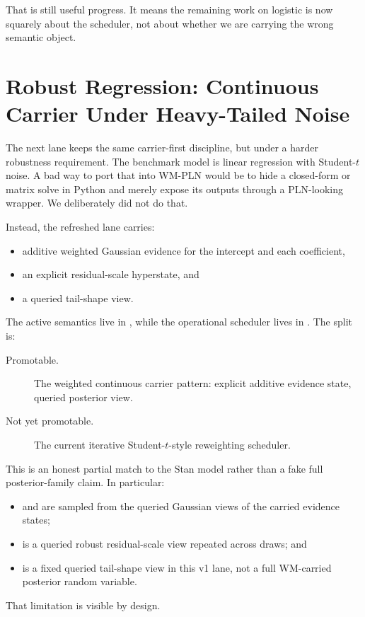\documentclass[11pt,openany]{report}
\begin{document}
\noindent
That is still useful progress.  It means the remaining work on logistic is now
squarely about the scheduler, not about whether we are carrying the wrong
semantic object.

\chapter{Robust Regression: Continuous Carrier Under Heavy-Tailed Noise}
\label{app:pplbench-robust-regression}

The next lane keeps the same carrier-first discipline, but under a harder
robustness requirement.  The benchmark model
 is linear regression with
Student-\(t\) noise.  A bad way to port that into WM-PLN would be to hide a
closed-form or matrix solve in Python and merely expose its outputs through a
PLN-looking wrapper.  We deliberately did not do that.

Instead, the refreshed lane carries:
\begin{itemize}
\item additive weighted Gaussian evidence for the intercept and each
coefficient,
\item an explicit residual-scale hyperstate, and
\item a queried tail-shape view.
\end{itemize}
The active semantics live in
,
while the operational scheduler lives in
.  The split is:
\begin{description}
\item[Promotable.] The weighted continuous carrier pattern:
explicit additive evidence state, queried posterior view.
\item[Not yet promotable.] The current iterative Student-\(t\)-style
reweighting scheduler.
\end{description}

This is an honest partial match to the Stan model rather than a fake full
posterior-family claim.  In particular:
\begin{itemize}
\item {} and  are sampled from the queried Gaussian views
of the carried evidence states;
\item {} is a queried robust residual-scale view repeated across
draws; and
\item {} is a fixed queried tail-shape view in this v1 lane, not a full
WM-carried posterior random variable.
\end{itemize}
That limitation is visible by design.
\end{document}
